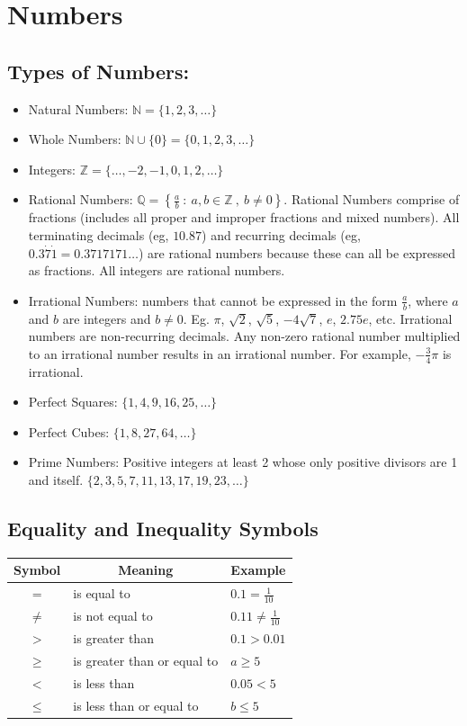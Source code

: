 \documentclass[twocolumn]{article}
\begin{document}
\section*{Numbers}

\subsection*{Types of Numbers:}

\begin{itemize}
\item Natural Numbers: $\mathbb{N} = \{1,2,3, \ldots\}$
\item Whole Numbers: $\mathbb{N} \cup \{0\} =\{0,1,2,3, \ldots\}$
\item Integers: $\mathbb{Z} =\{\ldots,-2,-1,0,1,2, \ldots\}$
\item Rational Numbers: $\mathbb{Q} = \left\{\frac{a}{b} \ : \  a, b \in \mathbb{Z} \ , \ b \neq 0 \right\}$. Rational Numbers comprise of fractions (includes all proper and improper fractions and mixed numbers). All terminating decimals (eg, $10.87$) and recurring decimals (eg, $0.3\dot{7}\dot{1} = 0.3717171\ldots$) are rational numbers because these can all be expressed as fractions. All integers are rational numbers.
\item Irrational Numbers: numbers that cannot be expressed in the form $\frac{a}{b}$, where $a$ and $b$ are integers and $b \neq 0$. Eg. $\pi$, $\sqrt{2}$, $\sqrt{5}$, $-4\sqrt{7}$, $e$, $2.75e$, etc. Irrational numbers are non-recurring decimals. Any non-zero rational number multiplied to an irrational number results in an irrational number. For example, $-\frac{3}{4}\pi$ is irrational.
\item Perfect Squares: $\{1,4,9,16,25, \ldots\}$
\item Perfect Cubes: $\{1,8,27,64, \ldots\}$
\item Prime Numbers: Positive integers at least 2 whose only positive divisors are 1 and itself. $\{2,3,5,7,11,13,17,19,23, \ldots\}$
\end{itemize}

\subsection*{Equality and Inequality Symbols}

\begin{tabular}{|c|l|l|}
	\hline Symbol & \multicolumn{1}{|c|}{ Meaning } & \multicolumn{1}{|c|}{ Example } \\
	\hline$=$ & is equal to & $0.1=\frac{1}{10}$ \\
	\hline$\neq$ & is not equal to & $0.11 \neq \frac{1}{10}$ \\
	\hline$>$ & is greater than & $0.1>0.01$ \\
	\hline$\geqslant$ & is greater than or equal to & $a \geqslant 5$ \\
	\hline$<$ & is less than & $0.05<5$ \\
	\hline$\leqslant$ & is less than or equal to & $b \leqslant 5$ \\
	\hline
\end{tabular}
\end{document}
